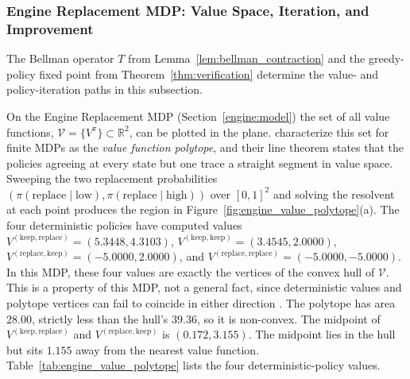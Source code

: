 

\FloatBarrier
\subsubsection{Engine Replacement MDP: Value Space, Iteration, and Improvement}
\label{engine:value_space}

The Bellman operator $T$ from Lemma~\ref{lem:bellman_contraction} and the greedy-policy fixed point from Theorem~\ref{thm:verification} determine the value- and policy-iteration paths in this subsection.

On the Engine Replacement MDP (Section~\ref{engine:model}) the set of all value functions, $\mathcal{V} = \{V^\pi\} \subset \mathbb{R}^2$, can be plotted in the plane. \citet{dadashi2019polytope} characterize this set for finite MDPs as the \emph{value function polytope}, and their line theorem states that the policies agreeing at every state but one trace a straight segment in value space. Sweeping the two replacement probabilities $(\pi(\text{replace} \mid \text{low}), \pi(\text{replace} \mid \text{high}))$ over $[0,1]^2$ and solving the resolvent at each point produces the region in Figure~\ref{fig:engine_value_polytope}(a). The four deterministic policies have computed values $V^{(\text{keep}, \text{replace})} = (5.3448, 4.3103)$, $V^{(\text{keep}, \text{keep})} = (3.4545, 2.0000)$, $V^{(\text{replace}, \text{keep})} = (-5.0000, 2.0000)$, and $V^{(\text{replace}, \text{replace})} = (-5.0000, -5.0000)$. In this MDP, these four values are exactly the vertices of the convex hull of $\mathcal{V}$. This is a property of this MDP, not a general fact, since deterministic values and polytope vertices can fail to coincide in either direction \citep{dadashi2019polytope}. The polytope has area $28.00$, strictly less than the hull's $39.36$, so it is non-convex. The midpoint of $V^{(\text{keep}, \text{replace})}$ and $V^{(\text{replace}, \text{keep})}$ is $(0.172, 3.155)$. The midpoint lies in the hull but sits $1.155$ away from the nearest value function. Table~\ref{tab:engine_value_polytope} lists the four deterministic-policy values.




